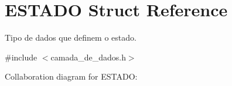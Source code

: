 \hypertarget{structESTADO}{}\section{E\+S\+T\+A\+DO Struct Reference}
\label{structESTADO}


Tipo de dados que definem o estado.  




{\ttfamily \#include $<$camada\+\_\+de\+\_\+dados.\+h$>$}



Collaboration diagram for E\+S\+T\+A\+DO\+:
